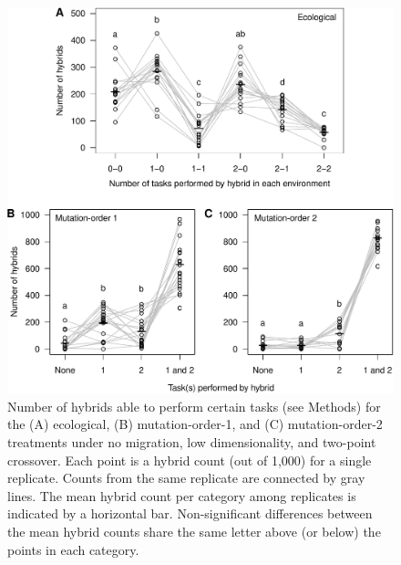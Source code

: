 \begin{doublespace}
\begin{figure}
\centering
\includegraphics[width=0.95\linewidth]{hybrid_counts.pdf}
\caption{Number of hybrids able to perform certain tasks (see Methods) for
  the (A) ecological, (B) mutation-order-1, and (C) mutation-order-2 treatments
  under no migration, low dimensionality, and two-point crossover.
  Each point is a hybrid count (out of 1,000) for a single replicate.
  Counts from the same replicate are connected by gray lines.
  The mean hybrid count per category among replicates
  is indicated by a horizontal bar.
  Non-significant differences between the mean hybrid counts
  share the same letter above (or below) the points in each category.}
\label{hybrid_counts}
\end{figure}


\end{doublespace}
